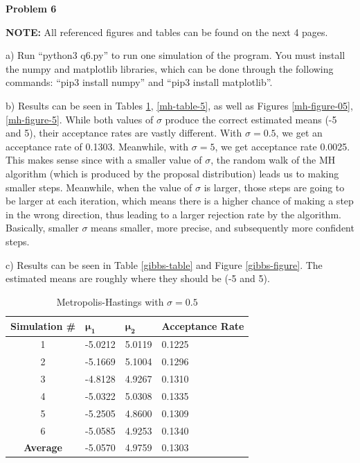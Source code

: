 \textbf{Problem 6}

\textbf{NOTE: }All referenced figures and tables can be found on the next 4 pages.

a) Run ``python3 q6.py'' to run one simulation of the program. You must install the numpy and matplotlib libraries, which can be done through the following commands: ``pip3 install numpy'' and ``pip3 install matplotlib''.

b) Results can be seen in Tables \ref{mh-table-05}, \ref{mh-table-5}, as well as Figures \ref{mh-figure-05}, \ref{mh-figure-5}. While both values of $\sigma$ produce the correct estimated means (-5 and 5), their acceptance rates are vastly different. With $\sigma = 0.5$, we get an acceptance rate of 0.1303. Meanwhile, with $\sigma = 5$, we get acceptance rate 0.0025. This makes sense since with a smaller value of $\sigma$, the random walk of the MH algorithm (which is produced by the proposal distribution) leads us to making smaller steps. Meanwhile, when the value of $\sigma$ is larger, those steps are going to be larger at each iteration, which means there is a higher chance of making a step in the wrong direction, thus leading to a larger rejection rate by the algorithm. Basically, smaller $\sigma$ means smaller, more precise, and subsequently more confident steps.

c) Results can be seen in Table \ref{gibbs-table} and Figure \ref{gibbs-figure}. The estimated means are roughly where they should be (-5 and 5).

\pagebreak \begin{table}[h]
	\centering
	\begin{tabular}{|c|l|l|l|}
		\hline
		\textbf{Simulation \#} & $\mathbf{\mu_1}$     & $\mathbf{\mu_2}$    & \textbf{Acceptance Rate} \\ \hline
		1 & -5.0212 & 5.0119 & 0.1225               \\ \hline
		2 & -5.1669 & 5.1004 & 0.1296               \\ \hline
		3 & -4.8128 & 4.9267 & 0.1310               \\ \hline
		4 & -5.0322 & 5.0308 & 0.1335               \\ \hline
		5 & -5.2505 & 4.8600 & 0.1309               \\ \hline
		6 & -5.0585 & 4.9253 & 0.1340               \\ \hline
		\textbf{Average} & -5.0570 & 4.9759 & 0.1303               \\ \hline
	\end{tabular}
	\caption{Metropolis-Hastings with $\sigma = 0.5$}
	\label{mh-table-05}
\end{table}

